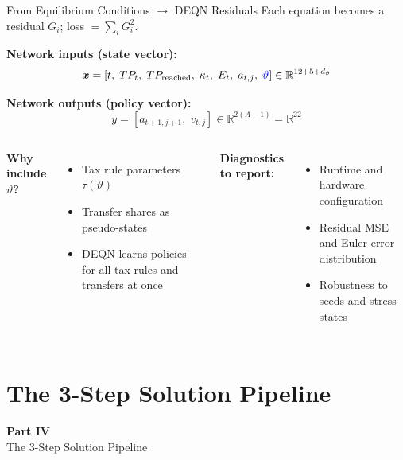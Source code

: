 \documentclass[aspectratio=169,11pt]{beamer}
\newcommand{\emphc}[1]{\textcolor{harvardcrimson}{#1}}
\newcommand{\x}{\bm{x}}
\begin{document}
\begin{frame}{From Equilibrium Conditions $\rightarrow$ DEQN Residuals}
\small
Each equation becomes a residual $G_i$; loss $= \sum_i G_i^2$.

\vspace{0.2cm}
\textbf{Network inputs (state vector):}
\[
\x = [t,\; TP_t,\; TP_{\mathrm{reached}},\; \kappa_t,\; E_t,\; a_{t,j},\; \textcolor{blue}{\vartheta}] \in \mathbb{R}^{12 + 5 + d_\vartheta}
\]

\textbf{Network outputs (policy vector):}
\[
y = [a_{t+1,j+1},\; v_{t,j}] \in \mathbb{R}^{2(A-1)} = \mathbb{R}^{22}
\]

\vspace{0.2cm}
\begin{columns}[T]
\textbf{Why include $\vartheta$?}
\begin{itemize}
    \item Tax rule parameters $\tau(\vartheta)$
    \item Transfer shares as pseudo-states
    \item DEQN learns policies for \emphc{all} tax rules and transfers at once
\end{itemize}

\textbf{Diagnostics to report:}
\begin{itemize}
    \item Runtime and hardware configuration
    \item Residual MSE and Euler-error distribution
    \item Robustness to seeds and stress states
\end{itemize}
\end{columns}
\end{frame}

\section{The 3-Step Solution Pipeline}

\begin{frame}{}
\vfill
\begin{center}
{\Huge \textcolor{uzhblue}{\textbf{Part IV}}}\\[12pt]
{\LARGE The 3-Step Solution Pipeline}
\end{center}
\vfill
\end{frame}
\end{document}
